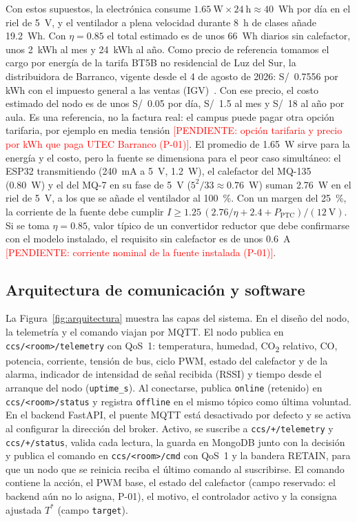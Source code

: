 \documentclass[manuscript,screen,nonacm,natbib=false]{acmart}
\newcommand{\pendiente}[1]{\textcolor{red}{[PENDIENTE: #1]}}
\newcommand{\COdos}{CO\textsubscript{2}}
\begin{document}
Con estos supuestos, la electrónica consume $1.65~\mathrm{W}\times 24~\mathrm{h} \approx 40$~Wh por día en el riel de 5~V, y el ventilador a plena velocidad durante 8~h de clases añade 19.2~Wh. Con $\eta = 0.85$ el total estimado es de unos 66~Wh diarios sin calefactor, unos 2~kWh al mes y 24~kWh al año. Como precio de referencia tomamos el cargo por energía de la tarifa BT5B no residencial de Luz del Sur, la distribuidora de Barranco, vigente desde el 4 de agosto de 2026: S/~0.7556 por kWh con el impuesto general a las ventas (IGV)~\cite{luzdelsur2026pliego}. Con ese precio, el costo estimado del nodo es de unos S/~0.05 por día, S/~1.5 al mes y S/~18 al año por aula. Es una referencia, no la factura real: el campus puede pagar otra opción tarifaria, por ejemplo en media tensión \pendiente{opción tarifaria y precio por kWh que paga UTEC Barranco (P-01)}. El promedio de 1.65~W sirve para la energía y el costo, pero la fuente se dimensiona para el peor caso simultáneo: el ESP32 transmitiendo (240~mA a 5~V, 1.2~W), el calefactor del MQ-135 (0.80~W) y el del MQ-7 en su fase de 5~V ($5^2/33 \approx 0.76$~W) suman 2.76~W en el riel de 5~V, a los que se añade el ventilador al 100~\%. Con un margen del 25~\%, la corriente de la fuente debe cumplir $I \geq 1.25\,(2.76/\eta + 2.4 + P_{\mathrm{PTC}})/(12~\mathrm{V})$. Si se toma $\eta = 0.85$, valor típico de un convertidor reductor que debe confirmarse con el modelo instalado, el requisito sin calefactor es de unos 0.6~A \pendiente{corriente nominal de la fuente instalada (P-01)}.

\subsection{Arquitectura de comunicación y software}
\label{sec:comunicacion}
La Figura~\ref{fig:arquitectura} muestra las capas del sistema. En el diseño del nodo, la telemetría y el comando viajan por MQTT. El nodo publica en \texttt{ccs/<room>/telemetry} con QoS~1: temperatura, humedad, \COdos{} relativo, CO, potencia, corriente, tensión de bus, ciclo PWM, estado del calefactor y de la alarma, indicador de intensidad de señal recibida (RSSI) y tiempo desde el arranque del nodo (\texttt{uptime\_s}). Al conectarse, publica \texttt{online} (retenido) en \texttt{ccs/<room>/status} y registra \texttt{offline} en el mismo tópico como última voluntad. En el backend FastAPI, el puente MQTT está desactivado por defecto y se activa al configurar la dirección del broker. Activo, se suscribe a \texttt{ccs/+/telemetry} y \texttt{ccs/+/status}, valida cada lectura, la guarda en MongoDB junto con la decisión y publica el comando en \texttt{ccs/<room>/cmd} con QoS~1 y la bandera RETAIN, para que un nodo que se reinicia reciba el último comando al suscribirse. El comando contiene la acción, el PWM base, el estado del calefactor (campo reservado: el backend aún no lo asigna, P-01), el motivo, el controlador activo y la consigna ajustada $T^{*}$ (campo \texttt{target}).
\end{document}
